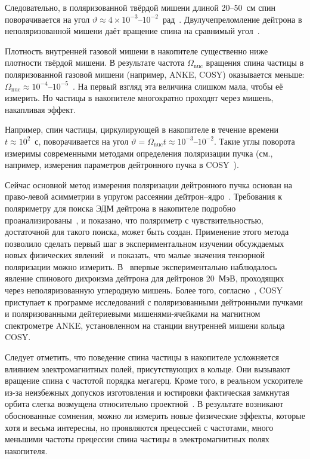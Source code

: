 \documentclass[11pt,a4paper]{article}
\begin{document}
Следовательно, в поляризованной твёрдой мишени длиной 20--50~см спин
поворачивается на угол $\vartheta\approx 4\times 10^{-3}$--$10^{-2}$~рад~\cite{BaryDub89,BaryShekht96}.
Двулучепреломление дейтрона в неполяризованной мишени даёт вращение спина
на сравнимый угол~\cite{Bary92,Bary93}.

Плотность внутренней газовой мишени в накопителе существенно ниже плотности
твёрдой мишени. В результате частота $\Omega_{\mathrm{nuc}}$ вращения спина
частицы в поляризованной газовой мишени (например, ANKE, COSY) оказывается
меньше: $\Omega_{\mathrm{nuc}}\approx 10^{-4}$--$10^{-5}$~\cite{Kacharava,BarySTORI05}.
На первый взгляд эта величина слишком мала, чтобы её измерить. Но частицы
в накопителе многократно проходят через мишень, накапливая эффект.

Например, спин частицы, циркулирующей в накопителе в течение времени
$t\approx 10^{2}$~с, поворачивается на угол
$\vartheta=\Omega_{\mathrm{nuc}} t\approx 10^{-3}$--$10^{-2}$. Такие углы
поворота измеримы современными методами определения поляризации пучка
(см., например, измерения параметров дейтронного пучка в COSY~\cite{Chiladze06}).

Сейчас основной метод измерения поляризации дейтронного пучка основан на
право-левой асимметрии в упругом рассеянии дейтрон--ядро~\cite{Olsen72}.
Требования к поляриметру для поиска ЭДМ дейтрона в накопителе подробно
проанализированы~\cite{Onderwater05}, и показано, что поляриметр
с чувствительностью, достаточной для такого поиска, может быть создан.
Применение этого метода позволило сделать первый шаг в экспериментальном
изучении обсуждаемых новых физических явлений~\cite{Bary05hepex}
и показать, что малые значения тензорной поляризации можно измерить.
В~\cite{Bary05hepex} впервые экспериментально наблюдалось явление спинового
дихроизма дейтрона для дейтронов 20~МэВ, проходящих через неполяризованную
углеродную мишень. Более того, согласно~\cite{Engels,Kacharava,Chiladze06},
COSY приступает к программе исследований с поляризованными дейтронными
пучками и поляризованными дейтериевыми мишенями-ячейками на магнитном
спектрометре ANKE, установленном на станции внутренней мишени кольца COSY.

Следует отметить, что поведение спина частицы в накопителе усложняется
влиянием электромагнитных полей, присутствующих в кольце. Они вызывают
вращение спина с частотой порядка мегагерц. Кроме того, в реальном
ускорителе из-за неизбежных допусков изготовления и юстировки фактическая
замкнутая орбита слегка возмущена относительно проектной~\cite{Jackson76,Derbenev73,Hoffstaetter06,Hoffstaetter00,Heinemann01,Mane05}.
В результате возникают обоснованные сомнения, можно ли измерить новые
физические эффекты, которые хотя и весьма интересны, но проявляются
прецессией с частотами, много меньшими частоты прецессии спина частицы
в электромагнитных полях накопителя.
\end{document}
